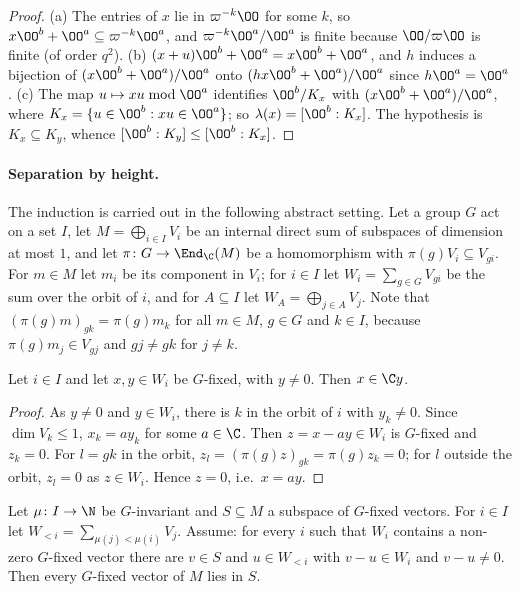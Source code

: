 \begin{proof}
(a) The entries of $x$ lie in $\varpi^{-k}\OO$ for some $k$, so $x\OO^b+\OO^a\subseteq\varpi^{-k}\OO^a$, and $\varpi^{-k}\OO^a/\OO^a$ is finite because
$\OO/\varpi\OO$ is finite (of order $q^2$). (b) $(x+u)\OO^b+\OO^a=x\OO^b+\OO^a$, and $h$ induces a bijection of $(x\OO^b+\OO^a)/\OO^a$ onto
$(hx\OO^b+\OO^a)/\OO^a$ since $h\OO^a=\OO^a$. (c) The map $u\mapsto xu\bmod\OO^a$ identifies $\OO^b/K_x$ with $(x\OO^b+\OO^a)/\OO^a$, where
$K_x=\{u\in\OO^b:xu\in\OO^a\}$; so $\shmiscla(x)=[\OO^b:K_x]$. The hypothesis is $K_x\subseteq K_y$, whence $[\OO^b:K_y]\le[\OO^b:K_x]$.
\end{proof}

\paragraph{Separation by height.}
The induction is carried out in the following abstract setting. Let a group $G$ act on a set $I$, let $M=\bigoplus_{i\in I}V_i$ be an
internal direct sum of subspaces of dimension at most $1$, and let $\pi\colon G\to\End_\C(M)$ be a homomorphism with $\pi(g)V_i\subseteq
V_{gi}$. For $m\in M$ let $m_i$ be its component in $V_i$; for $i\in I$ let $W_i=\sum_{g\in G}V_{gi}$ be the sum over the orbit of $i$, and for
$A\subseteq I$ let $W_A=\bigoplus_{j\in A}V_j$. Note that $(\pi(g)m)_{gk}=\pi(g)m_k$ for all $m\in M$, $g\in G$ and $k\in I$, because
$\pi(g)m_j\in V_{gj}$ and $gj\ne gk$ for $j\ne k$.

\begin{lemma}\label{pf:sh-misc:orbitline}
Let $i\in I$ and let $x,y\in W_i$ be $G$-fixed, with $y\ne0$. Then $x\in\C y$.
\end{lemma}

\begin{proof}
As $y\ne0$ and $y\in W_i$, there is $k$ in the orbit of $i$ with $y_k\ne0$. Since $\dim V_k\le1$, $x_k=ay_k$ for some $a\in\C$. Then
$z=x-ay\in W_i$ is $G$-fixed and $z_k=0$. For $l=gk$ in the orbit, $z_l=(\pi(g)z)_{gk}=\pi(g)z_k=0$; for $l$ outside the orbit, $z_l=0$ as
$z\in W_i$. Hence $z=0$, i.e.\ $x=ay$.
\end{proof}

\begin{lemma}\label{pf:sh-misc:orbitheight}
Let $\mu\colon I\to\N$ be $G$-invariant and $S\subseteq M$ a subspace of $G$-fixed vectors. For $i\in I$ let
$W_{<i}=\sum_{\mu(j)<\mu(i)}V_j$. Assume: for every $i$ such that $W_i$ contains a non-zero $G$-fixed vector there are $v\in S$ and $u\in
W_{<i}$ with $v-u\in W_i$ and $v-u\ne0$. Then every $G$-fixed vector of $M$ lies in $S$.
\end{lemma}


